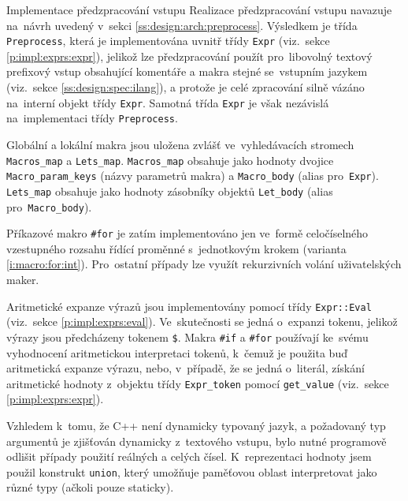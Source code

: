\documentclass[thesis=M,czech]{FITthesis}[2012/06/26]
\newcommand{\id}[1]{\texttt{#1}}
\newcommand{\rf}[1]{\ref{#1}}
\begin{document}
\begin{section}{Implementace předzpracování vstupu}\label{s:impl:preprocess}
Realizace předzpracování vstupu navazuje na~návrh
uvedený v~sekci \rf{ss:design:arch:preprocess}.
Výsledkem je třída \id{Preprocess},
která je implementována uvnitř třídy \id{Expr}
(viz.~sekce \rf{p:impl:exprs:expr}),
jelikož lze předzpracování použít pro~libovolný textový prefixový vstup
obsahující komentáře a makra stejné se~vstupním jazykem
(viz.~sekce \rf{ss:design:spec:ilang}),
a protože je celé zpracování silně vázáno na~interní objekt třídy \id{Expr}.
Samotná třída \id{Expr} je však nezávislá
na~implementaci třídy \id{Preprocess}.

Globální a lokální makra jsou uložena zvlášť
ve~vyhledávacích stromech
\id{Macros\_\-map} a \id{Lets\_\-map}.
\id{Macros\_\-map} obsahuje jako hodnoty
dvojice \id{Macro\_\-param\_\-keys}
(názvy parametrů makra)
a \id{Macro\_\-body}
(alias pro~\id{Expr}).
\id{Lets\_\-map} obsahuje jako hodnoty
zásobníky objektů \id{Let\_\-body}
(alias pro~\id{Macro\_\-body}).

Příkazové makro \id{\#for} je zatím implementováno
jen ve~formě celočíselného vzestupného rozsahu
řídící proměnné s~jednotkovým krokem
(varianta \rf{i:macro:for:int}).
Pro~ostatní případy lze využít rekurzivních volání uživatelských maker.


\begin{paragraph}{Aritmetické expanze}
\label{s:impl:preprocess:arith}
výrazů jsou implementovány pomocí třídy \id{Expr::\-Eval}
(viz.~sekce \rf{p:impl:exprs:eval}).
Ve~skutečnosti se jedná o~expanzi tokenu,
jelikož výrazy jsou předcházeny tokenem \id{\$}.
Makra \id{\#if} a \id{\#for} používají
ke~svému vyhodnocení
aritmetickou interpretaci tokenů,
k~čemuž je použita buď aritmetická expanze výrazu,
nebo, v~případě, že se jedná o~literál,
získání aritmetické hodnoty z~objektu třídy
\id{Expr\_\-token} pomocí \id{get\_\-value}
(viz.~sekce \rf{p:impl:exprs:expr}).

Vzhledem k~tomu, že C++ není dynamicky typovaný jazyk,
a požadovaný typ argumentů je zjišťován dynamicky z~textového vstupu,
bylo nutné programově odlišit případy použití
reálných a celých čísel.
K~reprezentaci hodnoty jsem použil
konstrukt \id{union},
který umožňuje paměťovou oblast
interpretovat jako různé typy (ačkoli pouze staticky).
\end{paragraph} %


\end{section}
\end{document}
